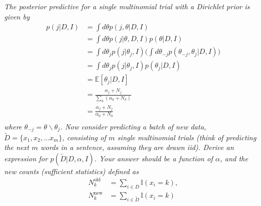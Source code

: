 \begin{example}
	\label{ex:313}
	\emph{The posterior predictive for a single multinomial trial with a Dirichlet prior is given by}
	\begin{equation}
		\begin{split}
			p(j|D,I) &= \int d\theta p(j,\theta|D,I)\\
			&= \int d\theta p(j|\theta,D,I)p(\theta|D,I)\\
			&= \int d\theta_j p(j|\theta_j,I)\bigg(\int d\theta_{-j} p(\theta_{-j},\theta_j|D,I)\bigg)\\
			&= \int d\theta_j p(j|\theta_j,I)p(\theta_j|D,I)\\
			& = \mathbb{E}[\theta_j|D,I]\\
			& = \frac{\alpha_{j}+N_j}{\sum_k(\alpha_k+N_k)}\\
			& = \frac{\alpha_{j}+N_j}{\alpha_0+N_0}\\
		\end{split}
	\end{equation}
	\emph{where $\theta_{-j}= \theta \backslash \theta_j$. Now consider predicting a batch of new data, $\tilde{D}=\{x_1,x_2,\dots x_m\}$, consisting of $m$ single multinomial trials (think of predicting the next $m$ words in a sentence, assuming they are drawn iid). Derive an expression for $p(\tilde{D}|D,\alpha,I)$. Your answer should be a function of $\alpha$, and the new counts (sufficient statistics) defined as}
	\begin{equation}
		\begin{split}
			N_k^{\text{old}} & = \sum_{i\in D} \mathbb{I}(x_i=k),\\
			N_k^{\text{new}} & = \sum_{i\in \tilde{D}} \mathbb{I}(x_i=k)\\
		\end{split}
	\end{equation}
	

\end{example}
